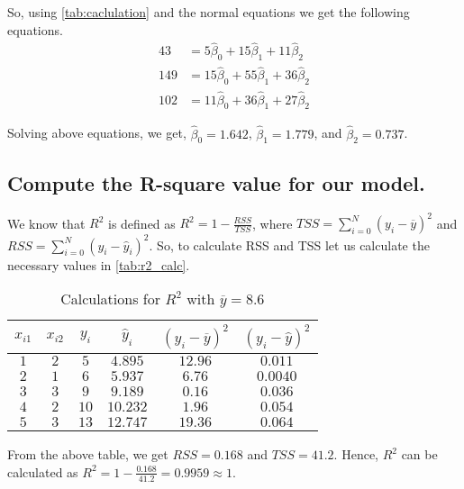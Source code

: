 \documentclass{article}
\begin{document}
So, using \autoref{tab:caclulation} and the normal equations we get the following equations.
\begin{equation*}
    \begin{split}
       43 &=  5 \hat{\beta}_0 +  15 \hat{\beta}_1 + 11 \hat{\beta}_2\\
       149 &= 15 \hat{\beta}_0 + 55 \hat{\beta}_1 + 36 \hat{\beta}_2 \\
       102 &= 11 \hat{\beta}_0 + 36 \hat{\beta}_1 + 27 \hat{\beta}_2
    \end{split}
\end{equation*}

Solving above equations, we get, $\hat{\beta}_0 = 1.642$, $\hat{\beta}_1 = 1.779$, and $\hat{\beta}_2 = 0.737$.

\subsection*{Compute the R-square value for our model.}

We know that $R^2$ is defined as $R^2 = 1 - \frac{RSS}{TSS}$, where $TSS = \sum_{i=0}^N \left( y_i - \overline{y} \right)^2$ and $RSS = \sum_{i=0}^N \left( y_i - \hat{y}_i \right)^2$.
So, to calculate RSS and TSS let us calculate the necessary values in \autoref{tab:r2_calc}.

\begin{table}[h!]
    \centering
    \caption{Calculations for $R^2$ with $\overline{y} = 8.6$}
    \label{tab:r2_calc}
    \begin{tabular}{c|c|c|c|c|c}
        \hline
        $x_{i1}$ & $x_{i2}$ & $y_i$ & $\hat{y}_i$ & $(y_i - \overline{y})^2$ & $(y_i - \hat{y})^2$ \\
        \hline
        $1$ & $2$ & $5$ & $4.895$& $12.96$ & $0.011$\\
        $2$ & $1$ & $6$ & $5.937$ & $6.76$ & $0.0040$\\
        $3$ & $3$ & $9$ & $9.189$ & $0.16$ & $0.036$\\
        $4$ & $2$ & $10$ & $10.232$ & $1.96$ & $0.054$\\
        $5$ & $3$ & $13$ & $12.747$ & $19.36$ & $0.064$\\
    \end{tabular}
\end{table}

From the above table, we get $RSS = 0.168$ and $TSS = 41.2$.
Hence, $R^2$ can be calculated as $R^2 = 1 - \frac{0.168}{41.2} = 0.9959 \approx 1$.
\end{document}

